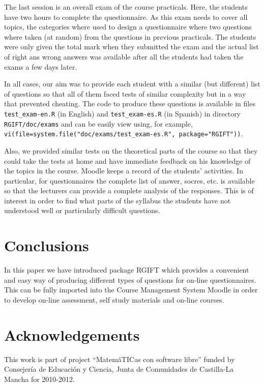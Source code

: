 \documentclass[a4paper]{article}
\newcommand{\code}[1]{\texttt{#1}}
\newcommand{\pkg}[1]{\textsf{#1}}
\begin{document}
The last session is an overall exam of the course practicals. Here, the
students have two hours to complete the questionnaire. As this exam needs to
cover all topics, the categories where used to design a questionnaire where two
questions where taken (at random) from the questions in previous practicals.
The students were only given the total mark when they submitted the exam and
the actual list of right ans wrong answers was available after all the students
had taken the exams a few days later.

In all cases, our aim was to provide each student with a similar (but
different) list of questions so that all of them faced tests of similar
complexity but in a way that prevented cheating.
The code to produce these questions is available in files 
\verb+test_exam-en.R+ (in English) and \verb+test_exam-es.R+ (in Spanish)
in directory \verb+RGIFT/doc/exams+ and can be easily view using, for example,
\code{vi(file=system.file("doc/exams/test\_exam-es.R", package="RGIFT"))}.

Also, we provided similar tests on the theoretical parts of the course so that
they could take the tests at home and have immediate feedback on his knowledge
of the topics in the course. Moodle keeps a record of the students' activities.
In particular, for questionnaires the complete list of answer, socres, etc.  is
available so that the lecturers can provide a complete analysis of the
responses. This is of interest in order to find what parts of the syllabus the
students have not understood well or particularly difficult questions.



\section{Conclusions}

In this paper we have introduced package \pkg{RGIFT} which provides a 
convenient and easy way of producing different types of questions
for on-line questionnaires. This can be fully imported into the
Course Management System Moodle in order to develop on-line assessment,
self study materials and on-line courses. 

\section{Acknowledgements}

This work is part of project ``MatemáTICas con software libre'' funded by
Consejería de Educación y Ciencia, Junta de Comunidades de Castilla-La Mancha
for 2010-2012.
\end{document}
